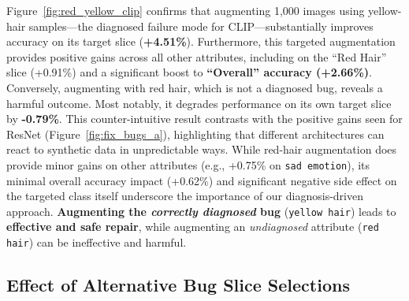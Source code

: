 \documentclass[10pt]{article} %
\begin{document}
Figure~\ref{fig:red_yellow_clip} confirms that augmenting 1{,}000 images using yellow-hair samples—the diagnosed failure mode for CLIP—substantially improves accuracy on its target slice (\textbf{+4.51\%}). Furthermore, this targeted augmentation provides positive gains across all other attributes, including on the ``Red Hair'' slice (+0.91\%) and a significant boost to \textbf{``Overall'' accuracy (+2.66\%)}. 
Conversely, augmenting with red hair, which is not a diagnosed bug, reveals a harmful outcome. Most notably, it degrades performance on its own target slice by \textbf{-0.79\%}. This counter-intuitive result contrasts with the positive gains seen for ResNet (Figure~\ref{fig:fix_bugs_a}), highlighting that different architectures can react to synthetic data in unpredictable ways. 
While red-hair augmentation does provide minor gains on other attributes (e.g., +0.75\% on \texttt{sad emotion}), its minimal overall accuracy impact (+0.62\%) and significant negative side effect on the targeted class itself underscore the importance of our diagnosis-driven approach. \textbf{Augmenting the \textit{correctly diagnosed} bug} (\texttt{yellow hair}) leads to \textbf{effective and safe repair}, while augmenting an \textit{undiagnosed} attribute (\texttt{red hair}) can be ineffective and harmful.

\vspace{10pt}
\subsection{Effect of Alternative Bug Slice Selections}



\begin{table}[t]
\centering
\footnotesize
\renewcommand{\arraystretch}{0.95}
\vspace{4pt}
\caption{RER (\%) for attribute-variant selections. Ours is the RH\_BS\_SE combination.}
\label{tab:base_and_attribute_variants}
\end{table}
\end{document}

